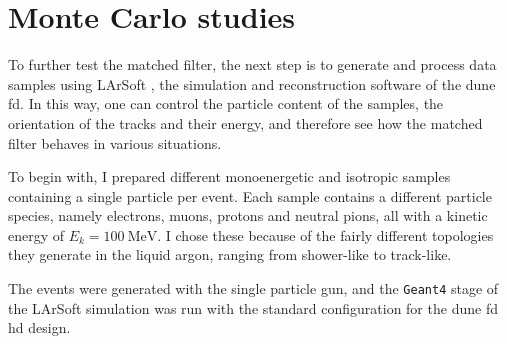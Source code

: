 \section{Monte Carlo studies}
\label{sec:matched_filter_mc_studies}

To further test the matched filter, the next step is to generate and process data samples using LArSoft \cite{Church2013}, the simulation and reconstruction software of the \gls{dune} \gls{fd}. In this way, one can control the particle content of the samples, the orientation of the tracks and their energy, and therefore see how the matched filter behaves in various situations.

To begin with, I prepared different monoenergetic and isotropic samples containing a single particle per event. Each sample contains a different particle species, namely electrons, muons, protons and neutral pions, all with a kinetic energy of $E_{k} = 100 \ \mathrm{MeV}$. I chose these because of the fairly different topologies they generate in the liquid argon, ranging from shower-like to track-like.

The events were generated with the single particle gun, and the \texttt{Geant4} stage of the LArSoft simulation was run with the standard configuration for the \gls{dune} \gls{fd} \gls{hd} design.


